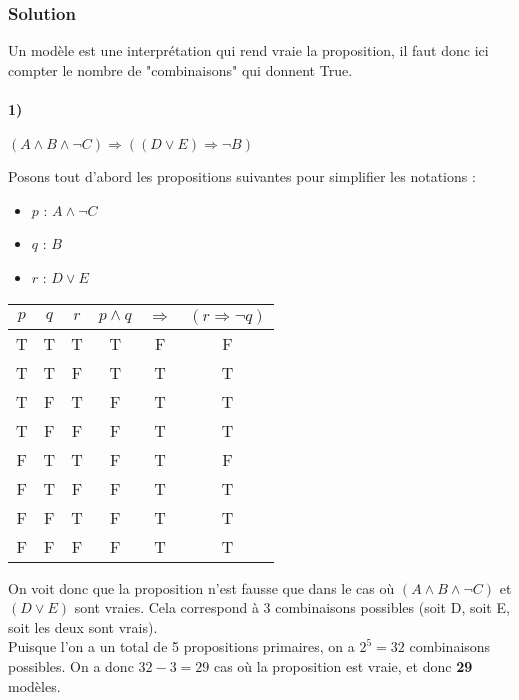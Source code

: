 \subsubsection*{Solution}


    Un modèle est une interprétation qui rend vraie la proposition, il faut donc ici compter le nombre de "combinaisons" qui donnent True.
    
    \paragraph{1)} $(A \land B \land \neg C) \Rightarrow ((D \lor E) \Rightarrow \neg B)$
    
    Posons tout d'abord les propositions suivantes pour simplifier les notations :
    \begin{itemize}
        \item $p$ : $A \land \neg C$
        \item $q$ : $B$
        \item $r$ : $D \lor E$
    \end{itemize}
    
    \begin{center}
    	\begin{tabular}{ccc|ccc}
    		$p$ & $q$ & $r$ & $p \land q$ & $\Rightarrow$ & $(r \Rightarrow \neg q)$\\
    		\hline
    		T & T & T & T & \color{red}F & F \\
    		T & T & F & T & \color{red}T & T \\
    		T & F & T & F & \color{red}T & T \\
    		T & F & F & F & \color{red}T & T \\
    		F & T & T & F & \color{red}T & F \\
    		F & T & F & F & \color{red}T & T \\
    		F & F & T & F & \color{red}T & T \\
    		F & F & F & F & \color{red}T & T \\
    	\end{tabular}
    \end{center}
    
    On voit donc que la proposition n'est fausse que dans le cas où $(A \land B \land \neg C)$ et $(D \lor E)$ sont vraies.
    Cela correspond à 3 combinaisons possibles (soit D, soit E, soit les deux sont vrais).\\
    Puisque l'on a un total de 5 propositions primaires, on a $2^5 = 32$ combinaisons possibles.
    On a donc $32-3 = 29$ cas où la proposition est vraie, et donc \textbf{29} modèles.\\
    
